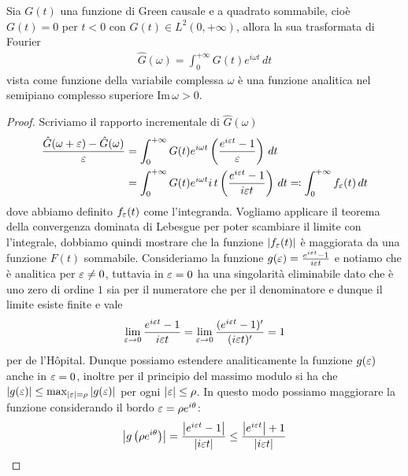 \begin{theorem}[  ] \label{thm: G causale e L2 allora la sua trasformata è analitica nel semipiano complesso superiore}
  Sia $ G(t) $ una funzione di Green causale e a quadrato sommabile, cioè $ G(t) = 0 $ per $ t < 0 $ con $ G(t) \in L^2(0, +\infty) $, allora 
  la sua trasformata di Fourier 
  \begin{align}
    \hat{G}(\omega) = \int_0^{+\infty}G(t) e^{i\omega t}\,dt
  \end{align}
  vista come funzione della variabile complessa $ \omega $ è una funzione analitica nel semipiano complesso superiore $ \text{Im}\,\omega >0 $.
\end{theorem}
\begin{proof}
  Scriviamo il rapporto incrementale di $ \hat{G}(\omega) $ 
  \begin{align}
    \frac{\hat{G}(\omega + \varepsilon) - \hat{G}(\omega)}{\varepsilon} &= \int_0^{+\infty} G(t) e^{i\omega t} \left( \frac{e^{i \varepsilon t} - 1}{\varepsilon} \right) \, dt
    \\
    &= \int_0^{+\infty} G(t) e^{i\omega t} i\,t \left( \frac{e^{i \varepsilon t} - 1}{i\varepsilon t} \right) \, dt \eqcolon \int_{0}^{+\infty} f_\varepsilon(t)\,dt
  \end{align}
  dove abbiamo definito $ f_\varepsilon(t) $ come l'integranda. Vogliamo applicare il teorema della convergenza dominata di Lebesgue per poter scambiare il 
  limite con l'integrale, dobbiamo quindi mostrare che la funzione $ \left|{f_\varepsilon(t)}\right| $ è maggiorata da una funzione $ F(t) $ sommabile. 
  Consideriamo la funzione $ g(\varepsilon) = \frac{e^{i\varepsilon t} -1}{i\varepsilon t} $ e notiamo che è analitica 
  per $ \varepsilon \neq 0 $, tuttavia in $ \varepsilon = 0 $ ha una singolarità eliminabile dato che è uno zero di ordine $ 1 $ sia per il numeratore che per il 
  denominatore e dunque il limite esiste finite e vale 
  \begin{align}
    \lim_{\varepsilon \to 0} \frac{e^{i\varepsilon t} -1}{i\varepsilon t} = \lim_{\varepsilon \to 0} \frac{(e^{i\varepsilon t} -1)'}{(i\varepsilon t)'} = 1
  \end{align}
  per de l'Hôpital. Dunque possiamo estendere analiticamente la funzione $ g(\varepsilon) $ anche in $ \varepsilon = 0 $, inoltre per il principio del massimo 
  modulo si ha che $ \left|{g(\varepsilon)}\right| \leq \max_{\left|{\varepsilon}\right| = \rho} \left|{g(\varepsilon)}\right| $ per ogni $ \left|{\varepsilon}\right| \leq \rho $. In questo modo possiamo maggiorare 
  la funzione considerando il bordo $ \varepsilon = \rho e^{i\theta} $:
  \begin{align}
    \abs{g\left( \rho e^{i\theta} \right)} = \frac{\abs{e^{i\eps t} - 1}}{\abs{i\eps t}} \leq \frac{\abs{e^{i\eps t}}+ 1}{\abs{i\eps t}} 

\end{align}
\end{proof}
